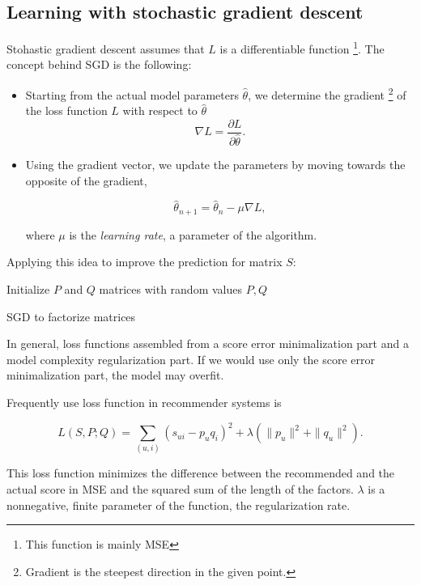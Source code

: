 \subsection{Learning with stochastic gradient descent}
Stohastic gradient descent assumes that $L$ is a differentiable function \footnote{
This function is mainly MSE}. The concept behind SGD is the following:
\begin{itemize}
\item Starting from the actual model parameters $\hat{\theta}$, we determine the 
gradient \footnote{Gradient is the steepest direction in the given point.} of 
the loss function $L$ with respect to $\hat{\theta}$
\[\nabla L = \frac{\partial L}{\partial \hat{\theta}}.\]

\item Using the gradient vector, we update the parameters by moving towards the 
opposite of the gradient,

\[ \hat{\theta}_{n+1}=\hat{\theta}_n - \mu \nabla L ,\]

where $\mu$ is the \emph{learning rate}, a parameter of the algorithm. 
\end{itemize}

Applying this idea to improve the prediction for matrix $S$:

\begin{algorithm}[H]
    Initialize $P$ and $Q$ matrices with random values\;
  \Return $P,Q$
  \caption{SGD to factorize matrices}
\end{algorithm}


In general, loss functions assembled from a score error minimalization part and 
a model complexity regularization part. If we would use only the score error 
minimalization part, the model may overfit.

Frequently use loss function in recommender systems is 

\[L(S,P;Q)=\sum_{(u,i)}(s_{ui}-p_u q_i)^2 + \lambda (\|p_u\|^2+\|q_u\|^2).\]

This loss function minimizes the difference between the recommended and the actual score in MSE 
and the squared sum of the length of the factors. $\lambda$ is a nonnegative, finite
parameter of the function, the regularization rate. 

